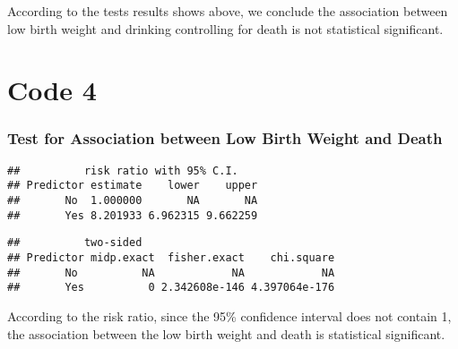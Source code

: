 \documentclass[
]{article}
\newenvironment{Shaded}{\begin{snugshade}}{\end{snugshade}}
\newcommand{\AttributeTok}[1]{\textcolor[rgb]{0.77,0.63,0.00}{#1}}
\newcommand{\CommentTok}[1]{\textcolor[rgb]{0.56,0.35,0.01}{\textit{#1}}}
\newcommand{\FunctionTok}[1]{\textcolor[rgb]{0.00,0.00,0.00}{#1}}
\newcommand{\NormalTok}[1]{#1}
\newcommand{\OtherTok}[1]{\textcolor[rgb]{0.56,0.35,0.01}{#1}}
\newcommand{\SpecialCharTok}[1]{\textcolor[rgb]{0.00,0.00,0.00}{#1}}
\begin{document}
According to the tests results shows above, we conclude the association
between low birth weight and drinking controlling for death is not
statistical significant.

\newpage

\hypertarget{code-4}{%
\section{Code 4}\label{code-4}}

\hypertarget{test-for-association-between-low-birth-weight-and-death}{%
\subsubsection{Test for Association between Low Birth Weight and
Death}\label{test-for-association-between-low-birth-weight-and-death}}

\begin{Shaded}
\end{Shaded}

\begin{verbatim}
##          risk ratio with 95% C.I.
## Predictor estimate    lower    upper
##       No  1.000000       NA       NA
##       Yes 8.201933 6.962315 9.662259
\end{verbatim}

\begin{Shaded}
\end{Shaded}

\begin{verbatim}
##          two-sided
## Predictor midp.exact  fisher.exact    chi.square
##       No          NA            NA            NA
##       Yes          0 2.342608e-146 4.397064e-176
\end{verbatim}

According to the risk ratio, since the 95\% confidence interval does not
contain 1, the association between the low birth weight and death is
statistical significant.
\end{document}

